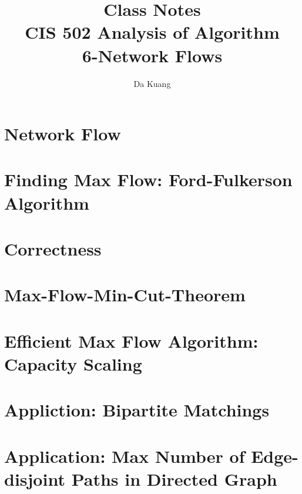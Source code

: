 \documentclass[en,hazy,blue,normal,12pt]{elegantnote}
\title{Class Notes\\CIS 502 Analysis of Algorithm\\6-Network Flows}
\author{Da Kuang}
\institute{University of Pennsylvania}
\date{}
\begin{document}
\maketitle
\newpage
\tableofcontents
\newpage
% 
\section{Network Flow}

\section{Finding Max Flow: Ford-Fulkerson Algorithm}

\section{Correctness}

\section{Max-Flow-Min-Cut-Theorem}

\section{Efficient Max Flow Algorithm: Capacity Scaling}

\section{Appliction: Bipartite Matchings}

\section{Application: Max Number of Edge-disjoint Paths in Directed Graph}

\end{document}
